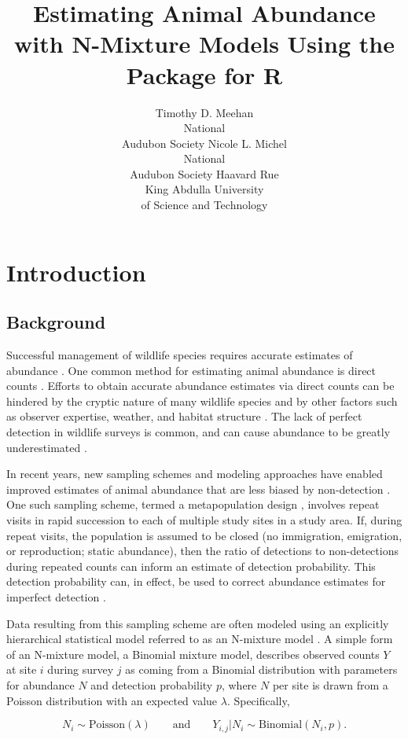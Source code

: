 \documentclass[article]{jss}
\author{Timothy D. Meehan\\National\\Audubon Society \And
        Nicole L. Michel\\National\\Audubon Society \And
        Haavard Rue\\King Abdulla University\\of Science and Technology}
\title{Estimating Animal Abundance with N-Mixture Models Using the \pkg{R-INLA} Package for R}
\begin{document}
\section[Introduction]{Introduction}
\subsection[Background]{Background}
Successful management of wildlife species requires accurate estimates of abundance \citep{Yoccoz_Nichols_Boulinier_2001}. One common method for estimating animal abundance is direct counts \citep{Pollock_Nichols_Simons_Farnsworth_Bailey_Sauer_2002}. Efforts to obtain accurate abundance estimates via direct counts can be hindered by the cryptic nature of many wildlife species and by other factors such as observer expertise, weather, and habitat structure \citep{Denes_Silveira_Beissinger_2015}. The lack of perfect detection in wildlife surveys is common, and can cause abundance to be greatly underestimated \citep{Wenger_Freeman_2008, Joseph_Elkin_Martin_Possingham_2009}.

In recent years, new sampling schemes and modeling approaches have enabled improved estimates of animal abundance that are less biased by non-detection \citep{Denes_Silveira_Beissinger_2015}. One such sampling scheme, termed a metapopulation design \citep{Kery_Royle_2010}, involves repeat visits in rapid succession to each of multiple study sites in a study area. If, during repeat visits, the population is assumed to be closed (no immigration, emigration, or reproduction; static abundance), then the ratio of detections to non-detections during repeated counts can inform an estimate of detection probability. This detection probability can, in effect, be used to correct abundance estimates for imperfect detection \citep{Royle_2004}.

Data resulting from this sampling scheme are often modeled using an explicitly hierarchical statistical model referred to as an N-mixture model \citep{Royle_Nichols_2003, Dodd_Dorazio_2004, Royle_2004, Kery_Royle_Schmid_2005}. A simple form of an N-mixture model, a Binomial mixture model, describes observed counts $Y$ at site $i$ during survey $j$ as coming from a Binomial distribution with parameters for abundance $N$ and detection probability $p$, where $N$ per site is drawn from a Poisson distribution with an expected value $\lambda$. Specifically,

$$N_i \sim \text{Poisson}(\lambda) \qquad \text{and} \qquad  Y_{i,j} | N_i \sim \text{Binomial}(N_i, p).$$
\end{document}
